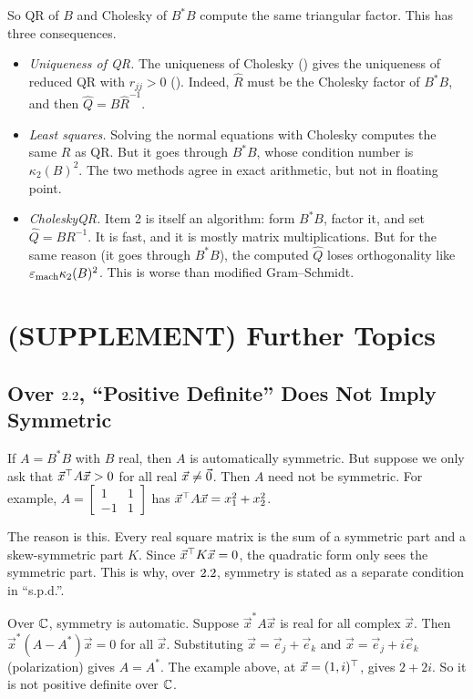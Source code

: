 So QR of $B$ and Cholesky of $B^\ast B$ compute the same triangular factor. This has three consequences.
\begin{itemize}
  \item \emph{Uniqueness of QR.} The uniqueness of Cholesky () gives the uniqueness of reduced QR with $r_{jj} > 0$ (). Indeed, $\hat{R}$ must be the Cholesky factor of $B^\ast B$, and then $\hat{Q} = B\hat{R}^{-1}$.
  \item \emph{Least squares.} Solving the normal equations with Cholesky computes the same $R$ as QR. But it goes through $B^\ast B$, whose condition number is $\kappa_2(B)^2$. The two methods agree in exact arithmetic, but not in floating point.
  \item \emph{CholeskyQR.} Item 2 is itself an algorithm: form $B^\ast B$, factor it, and set $\hat{Q} = BR^{-1}$. It is fast, and it is mostly matrix multiplications. But for the same reason (it goes through $B^\ast B$), the computed $\hat{Q}$ loses orthogonality like $\varepsilon_{\mathrm{mach}}\kappa_2(B)^2$. This is worse than modified Gram--Schmidt.
\end{itemize}

\section{(SUPPLEMENT) Further Topics}
\subsection{Over $2.2$, ``Positive Definite'' Does Not Imply Symmetric}

If $A = B^\ast B$ with $B$ real, then $A$ is automatically symmetric. But suppose we only ask that $\vec{x}^\top A\vec{x} > 0$ for all real $\vec{x} \ne \vec{0}$. Then $A$ need not be symmetric. For example, $A = \left[\begin{smallmatrix} 1 & 1 \\ -1 & 1 \end{smallmatrix}\right]$ has $\vec{x}^\top A\vec{x} = x_1^2 + x_2^2$.

The reason is this. Every real square matrix is the sum of a symmetric part and a skew-symmetric part $K$. Since $\vec{x}^\top K\vec{x} = 0$, the quadratic form only sees the symmetric part. This is why, over $2.2$, symmetry is stated as a separate condition in ``s.p.d.''.

Over $\mathbb{C}$, symmetry is automatic. Suppose $\vec{x}^\ast A\vec{x}$ is real for all complex $\vec{x}$. Then $\vec{x}^\ast(A - A^\ast)\vec{x} = 0$ for all $\vec{x}$. Substituting $\vec{x} = \vec{e}_j + \vec{e}_k$ and $\vec{x} = \vec{e}_j + i\vec{e}_k$ (polarization) gives $A = A^\ast$. The example above, at $\vec{x} = (1, i)^\top$, gives $2 + 2i$. So it is not positive definite over $\mathbb{C}$.

